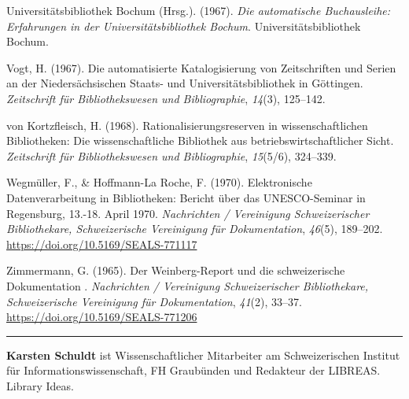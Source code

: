 \documentclass[a4paper,
fontsize=11pt,
oneside,
numbers=noperiodatend,
parskip=half-,
bibliography=totoc,
final
]{scrartcl}
\begin{document}
Universitätsbibliothek Bochum (Hrsg.). (1967). \emph{Die automatische
Buchausleihe: Erfahrungen in der Universitätsbibliothek Bochum}.
Universitätsbibliothek Bochum.

Vogt, H. (1967). Die automatisierte Katalogisierung von Zeitschriften
und Serien an der Niedersächsischen Staats- und Universitätsbibliothek
in Göttingen. \emph{Zeitschrift für Bibliothekswesen und Bibliographie},
\emph{14}(3), 125--142.

von Kortzfleisch, H. (1968). Rationalisierungsreserven in
wissenschaftlichen Bibliotheken: Die wissenschaftliche Bibliothek aus
betriebswirtschaftlicher Sicht. \emph{Zeitschrift für Bibliothekswesen
und Bibliographie}, \emph{15}(5/6), 324--339.

Wegmüller, F., \& Hoffmann-La Roche, F. (1970). Elektronische
Datenverarbeitung in Bibliotheken: Bericht über das UNESCO-Seminar in
Regensburg, 13.-18. April 1970. \emph{Nachrichten / Vereinigung
Schweizerischer Bibliothekare, Schweizerische Vereinigung für
Dokumentation}, \emph{46}(5), 189--202.
\url{https://doi.org/10.5169/SEALS-771117}

Zimmermann, G. (1965). Der Weinberg-Report und die schweizerische
Dokumentation . \emph{Nachrichten / Vereinigung Schweizerischer
Bibliothekare, Schweizerische Vereinigung für Dokumentation},
\emph{41}(2), 33--37. \url{https://doi.org/10.5169/SEALS-771206}

\begin{center}\rule{0.5\linewidth}{0.5pt}\end{center}

\textbf{Karsten Schuldt} ist Wissenschaftlicher Mitarbeiter am
Schweizerischen Institut für Informationswissenschaft, FH Graubünden und
Redakteur der LIBREAS. Library Ideas.
\end{document}
